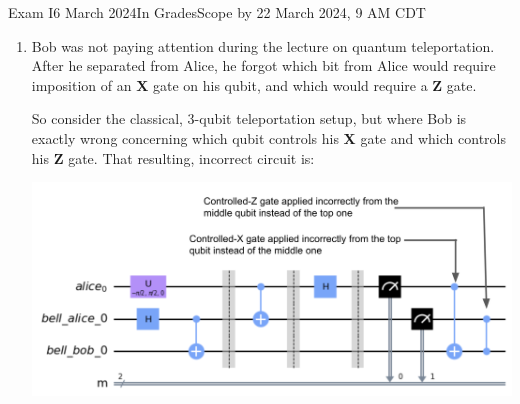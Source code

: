 \documentclass[12pt]{article}
\def\Gate#1{\mbox{\textbf{#1}}}
\def\X{\Gate{X}}
\def\Z{\Gate{Z}}
\newcommand{\Blank}[1][1in]{\mbox{\vrule width #1 depth 2pt}\vrule width 0pt height 2.0em}
\begin{document}
\begin{assignment}{Exam I}{6 March 2024}{In GradesScope by 22 March 2024, 9 AM CDT}
\begin{enumerate}
\begin{BBKey}
\begin{center}
\begin{tabular}{c|c||c|c||c|c||c}
\end{tabular}
\end{center}
\end{BBKey}
\begin{itemize}
    \item Alice believes the shared key is~\Blank[4in]{}
    \item Bob believes the shared key is\ \ ~\Blank[4in]{}
    \item Eve could have been detected in how many rows of your table?~\Blank{}
\end{itemize}

\clearpage\item{}
Bob was not paying attention during the lecture on quantum teleportation.  After he separated from Alice, he forgot which bit from Alice would require imposition of an \X{} gate on his qubit, and which would require a \Z{} gate.

So consider the classical, 3-qubit teleportation setup, but where Bob is exactly wrong concerning which qubit controls his \X{} gate and which controls his \Z{} gate.  That resulting, incorrect circuit is:

\includegraphics[scale=0.25]{tportwrong.png}


\end{enumerate}
\end{assignment}
\end{document}
